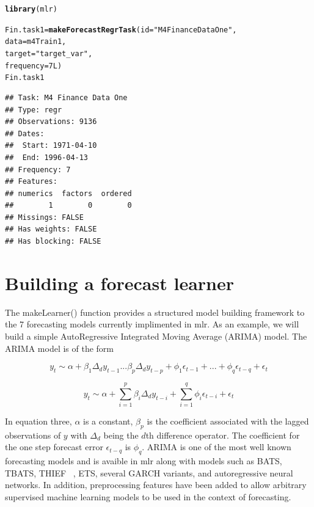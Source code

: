 \documentclass{article}\usepackage[]{graphicx}\usepackage[]{color}
\makeatletter
\newcommand{\hlnum}[1]{\textcolor[rgb]{0.686,0.059,0.569}{#1}}%
\newcommand{\hlstr}[1]{\textcolor[rgb]{0.192,0.494,0.8}{#1}}%
\newcommand{\hlstd}[1]{\textcolor[rgb]{0.345,0.345,0.345}{#1}}%
\newcommand{\hlkwb}[1]{\textcolor[rgb]{0.69,0.353,0.396}{#1}}%
\newcommand{\hlkwc}[1]{\textcolor[rgb]{0.333,0.667,0.333}{#1}}%
\newcommand{\hlkwd}[1]{\textcolor[rgb]{0.737,0.353,0.396}{\textbf{#1}}}%
\newenvironment{kframe}{%
 \def\at@end@of@kframe{}%
 \ifinner\ifhmode%
  \def\at@end@of@kframe{\end{minipage}}%
  \begin{minipage}{\columnwidth}%
 \fi\fi%
 \def\FrameCommand##1{\hskip\@totalleftmargin \hskip-\fboxsep
 \colorbox{shadecolor}{##1}\hskip-\fboxsep
     \hskip-\linewidth \hskip-\@totalleftmargin \hskip\columnwidth}%
 \MakeFramed {\advance\hsize-\width
   \@totalleftmargin\z@ \linewidth\hsize
   \@setminipage}}%
 {\par\unskip\endMakeFramed%
 \at@end@of@kframe}
\newenvironment{knitrout}{}{} %
\theoremstyle{definition}
\newcommand\code{\@codex}
\def\@codex#1{{\normalfont\ttfamily\hyphenchar\font=-1 #1}}
\newcommand{\pkg}[1]{{\fontseries{b}\selectfont #1}}
\makeatother
\begin{document}
\begin{knitrout}
\color{fgcolor}\begin{kframe}
\begin{alltt}
\hlkwd{library}\hlstd{(mlr)}
\end{alltt}


{\ttfamily\noindent\itshape\color{messagecolor}{\#\# Loading required package: ParamHelpers}}\begin{alltt}
\hlstd{Fin.task1} \hlkwb{=} \hlkwd{makeForecastRegrTask}\hlstd{(}\hlkwc{id} \hlstd{=} \hlstr{"M4 Finance Data One"}\hlstd{,}
                                 \hlkwc{data} \hlstd{= m4Train1,}
                                 \hlkwc{target} \hlstd{=} \hlstr{"target_var"}\hlstd{,}
                                 \hlkwc{frequency} \hlstd{=} \hlnum{7L}\hlstd{)}
\hlstd{Fin.task1}
\end{alltt}
\begin{verbatim}
## Task: M4 Finance Data One
## Type: regr
## Observations: 9136
## Dates:
##  Start: 1971-04-10 
##  End: 1996-04-13
## Frequency: 7
## Features:
## numerics  factors  ordered 
##        1        0        0 
## Missings: FALSE
## Has weights: FALSE
## Has blocking: FALSE
\end{verbatim}
\end{kframe}
\end{knitrout}

\section{Building a forecast learner}

The \code{makeLearner()} function provides a structured model building framework to the 7 forecasting models currently implimented in \pkg{mlr}. As an example, we will build a simple AutoRegressive Integrated Moving Average (ARIMA) model. The ARIMA model is of the form

\begin{equation}
y_t \sim \alpha + \beta_1 \Delta_d y_{t-1} ... \beta_p \Delta_d y_{t-p} + \phi_1 \epsilon_{t-1} + ... + \phi_q \epsilon_{t-q} + \epsilon_t
\end{equation}

\begin{equation}
y_t \sim \alpha + \sum_{i=1}^p \beta_i \Delta_d y_{t-i} + \sum_{i=1}^q \phi_i \epsilon_{t-i} +\epsilon_t
\end{equation}

In equation three, $\alpha$ is a constant, $\beta_p$ is the coefficient associated with the lagged observations of $y$ with $\Delta_d$ being the $d$th difference operator. The coefficient for the one step forecast error $\epsilon_{t-q}$ is $\phi_q$. ARIMA is one of the most well known forecasting models and is avaible in mlr along with models such as BATS, TBATS, THIEF ~\cite{thief}, ETS, several GARCH variants, and autoregressive neural networks. In addition, preprocessing features have been added to allow arbitrary supervised machine learning models to be used in the context of forecasting.
\end{document}
